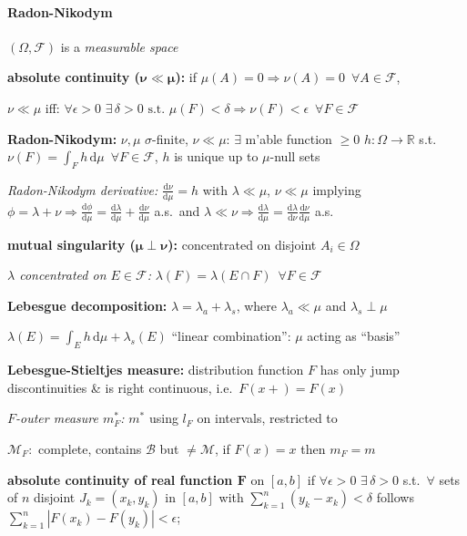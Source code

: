 \documentclass[8pt,twoside]{extarticle}
\begin{document}
\begin{multicols}{2}
\paragraph{Radon-Nikodym} $(\Omega, \mathcal{F})$ is a \textit{measurable space}

\textbf{absolute continuity ($\boldsymbol{\nu \ll \mu}$):} if $\mu(A){=}0 \Rightarrow \nu(A){=}0 \,\,\,\forall A{\in}\mathcal{F}$,

$\nu\ll \mu$ iff: $\forall \epsilon>0 \,\,\exists\, \delta>0 \text{ s.t. } \mu(F)<\delta \Rightarrow \nu(F)<\epsilon\,\,\,\forall F{\in}\mathcal{F}$

\textbf{Radon-Nikodym:} $\nu,\mu$ $\sigma$-finite, $\nu\ll \mu$: $\exists$ m'able function $\geq 0$ $h:\Omega\to \mathbb{R}$ s.t.\ $\nu(F){=}\int_F h\,\mathrm{d}\mu \,\,\,\forall F{\in}\mathcal{F}$, $h$ is unique up to $\mu$-null sets

\textit{Radon-Nikodym derivative:} $\frac{\mathrm{d}\nu}{\mathrm{d}\mu}=h$ with $\lambda\ll\mu$, $\nu\ll \mu$ implying $\phi=\lambda{+}\nu \Rightarrow  \frac{\mathrm{d}\phi}{\mathrm{d}\mu}=\frac{\mathrm{d}\lambda}{\mathrm{d}\mu}+\frac{\mathrm{d}\nu}{\mathrm{d}\mu}$ a.s.\ and $\lambda\ll\nu\Rightarrow \frac{\mathrm{d}\lambda}{\mathrm{d}\mu}=\frac{\mathrm{d}\lambda}{\mathrm{d}\nu}\frac{\mathrm{d}\nu}{\mathrm{d}\mu}$ a.s. 

\textbf{mutual singularity ($\boldsymbol{\mu \!\perp\! \nu}$):} concentrated on disjoint  $A_i{\in}\Omega$

\textit{$\lambda$ concentrated on $E{\in}\mathcal{F}$:}  $\lambda(F)=\lambda(E\cap F) \,\,\, \forall F{\in}\mathcal{F}$

\textbf{Lebesgue decomposition:} $\lambda {=} \lambda_a{+}\lambda_s$, where $\lambda_a \ll\mu$ and $\lambda_s{\perp} \mu$

$\lambda(E)=\int_E h \,\mathrm{d}\mu + \lambda_s(E)$ ``linear combination'': $\mu$ acting as ``basis''

\textbf{Lebesgue-Stieltjes measure:} distribution function $F$ has only jump discontinuities \& is right continuous, i.e.\ $F(x{+})=F(x)$

\textit{$F$-outer measure $m_F^*$:} $m^*$ using $l_F$ on intervals, restricted to 

$\mathcal{M}_F:$ complete, contains $\mathcal{B}$ but $\neq \mathcal{M}$,  if $F(x)=x$ then $m_F=m$

\textbf{absolute continuity of real function $\boldsymbol{F}$} on $[a,b]$ if $\forall \epsilon {>}0\,\, \exists\, \delta{>}0$ s.t.\ $\forall$ sets of $n$ disjoint $J_k =(x_k,y_k)$ in $[a,b]$ with $\sum_{k=1}^n(y_k-x_k)<\delta$ follows $\sum_{k=1}^n|F(x_k)-F(y_k)|<\epsilon$;


\end{multicols}
\end{document}
